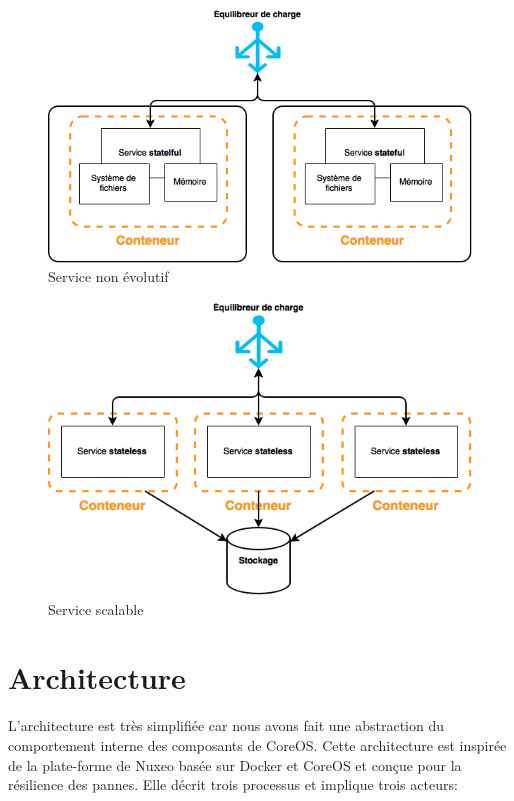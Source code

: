 \begin{onehalfspace}
\begin{figure}[H]
\centering
\includegraphics [scale=0.5]{chapitre4/assets/stateful}
\caption{Service non évolutif}
\label{fig:non-scalable}
\end{figure}

\begin{figure}[H]
\centering
\includegraphics [scale=0.5]{chapitre4/assets/stateless}
\caption{Service scalable}
\label{fig:scalable}
\end{figure}


\section{Architecture}



L'architecture est très simplifiée car nous avons fait une abstraction du comportement interne des composants de CoreOS. Cette architecture est inspirée de la plate-forme de Nuxeo \cite{nuxeo} basée sur Docker et CoreOS et conçue pour la résilience des pannes. Elle décrit trois processus et implique trois acteurs:



\end{onehalfspace}
